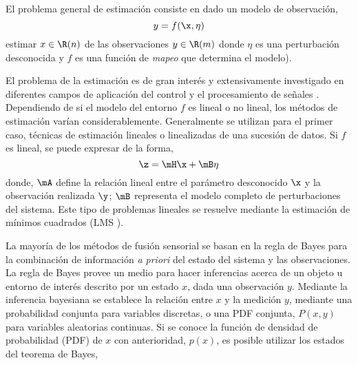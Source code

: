 El problema general de estimación consiste en dado un modelo de observación,
\begin{equation}
	y=f(\x,\eta)
\end{equation}
estimar $x \in \R(n)$ de las observaciones $y \in \R(m)$ donde $\eta$ es una perturbación desconocida y $f$ es una función de \textit{mapeo} que determina el modelo).

El problema de la estimación es de gran interés y extensivamente investigado en diferentes campos de aplicación del control y el procesamiento de señales \cite{Ruiz2009}.
Dependiendo de si el modelo del entorno $f$ es lineal o no lineal, los métodos de estimación varían considerablemente. 
Generalmente se utilizan para el primer caso, técnicas de estimación lineales o linealizadas de una sucesión de datos.
Si $f$ es lineal, se puede expresar de la forma,
\begin{equation}
	\z=\mH \x+\mB \eta
\end{equation}
donde, $\mA$ define la relación lineal entre el parámetro desconocido $\x$ y la observación realizada $\y$;
$\mB$ representa el modelo completo de perturbaciones del sistema. Este tipo de problemas lineales se resuelve mediante la  estimación de mínimos cuadrados (LMS ).\par
La mayoría de los métodos de fusión sensorial se basan en la regla de Bayes para la combinación de información \textit{a priori} del estado del sistema y las observaciones.
La regla de Bayes provee un medio para hacer inferencias acerca de un objeto u entorno de interés descrito por un estado $x$, dada una observación $y$.
Mediante la inferencia bayesiana se establece la relación entre $x$ y la medición $y$, mediante una probabilidad conjunta para variables discretas, o una PDF conjunta, $P(x,y)$ para variables aleatorias continuas.
Si se conoce la función de densidad de probabilidad (PDF) de $x$ con anterioridad, $p(x)$, es posible utilizar los estados del teorema de Bayes,
